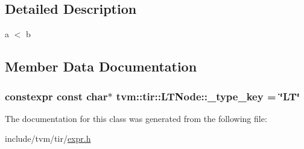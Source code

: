 \subsection{Detailed Description}
a $<$ b 

\subsection{Member Data Documentation}
\subsubsection[{\texorpdfstring{\+\_\+type\+\_\+key}{_type_key}}]{\setlength{\rightskip}{0pt plus 5cm}constexpr const char$\ast$ tvm\+::tir\+::\+L\+T\+Node\+::\+\_\+type\+\_\+key = \char`\"{}LT\char`\"{}\hspace{0.3cm}{\ttfamily [static]}}\hypertarget{classtvm_1_1tir_1_1LTNode_a9bdbb501e4868e67d07fd702e552475a}{}\label{classtvm_1_1tir_1_1LTNode_a9bdbb501e4868e67d07fd702e552475a}


The documentation for this class was generated from the following file\+:\begin{DoxyCompactItemize}
\item 
include/tvm/tir/\hyperlink{tir_2expr_8h}{expr.\+h}\end{DoxyCompactItemize}
